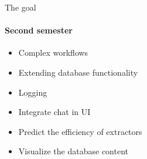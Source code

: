 \begin{frame}{The goal}
\framesubtitle{Second semester}
	\begin{itemize}
		\item Complex workflows
		\item Extending database functionality
		\item Logging
		\item Integrate chat in UI
		\item Predict the efficiency of extractors
		\item Visualize the database content
	\end{itemize}
\end{frame}
